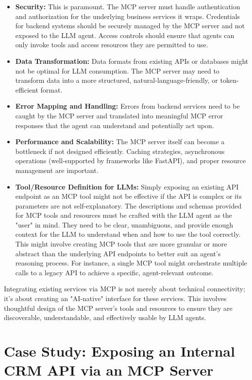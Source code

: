 \begin{itemize}
    \item \textbf{Security:} This is paramount. The MCP server must handle authentication and authorization for the underlying business services it wraps. 
    Credentials for backend systems should be securely managed by the MCP server and not exposed to the LLM agent. Access controls should ensure that 
    agents can only invoke tools and access resources they are permitted to use.
    \item \textbf{Data Transformation:} Data formats from existing APIs or databases might not be optimal for LLM consumption. The MCP server may 
    need to transform data into a more structured, natural-language-friendly, or token-efficient format.
    \item \textbf{Error Mapping and Handling:} Errors from backend services need to be caught by the MCP server and translated into meaningful 
    MCP error responses that the agent can understand and potentially act upon.
    \item \textbf{Performance and Scalability:} The MCP server itself can become a bottleneck if not designed efficiently. Caching strategies, 
    asynchronous operations (well-supported by frameworks like FastAPI), and proper resource management are important.
    \item \textbf{Tool/Resource Definition for LLMs:} Simply exposing an existing API endpoint as an MCP tool might not be effective if the 
    API is complex or its parameters are not self-explanatory. The descriptions and schemas provided for MCP tools and resources must be crafted 
    with the LLM agent as the "user" in mind. They need to be clear, unambiguous, and provide enough context for the LLM to understand when and 
    how to use the tool correctly. This might involve creating MCP tools that are more granular or more abstract than the underlying API endpoints to 
    better suit an agent's reasoning process. For instance, a single MCP tool might orchestrate multiple calls to a legacy API to achieve a specific, 
    agent-relevant outcome.
\end{itemize}

Integrating existing services via MCP is not merely about technical connectivity; it's about creating an "AI-native" interface for these services. 
This involves thoughtful design of the MCP server's tools and resources to ensure they are discoverable, understandable, and effectively usable by LLM agents.

\section{Case Study: Exposing an Internal CRM API via an MCP Server}

